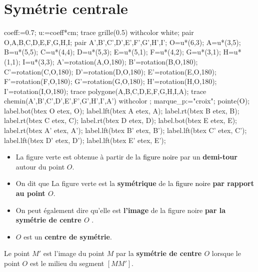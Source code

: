\section{Symétrie centrale}
\begin{minipage}{0.5\linewidth}
\begin{center}

    \begin{Geometrie}[CoinHD={(8.4u,4.2u)}]
        coeff:=0.7;
        u:=coeff*cm;        
        trace grille(0.5) withcolor white;        
        pair O,A,B,C,D,E,F,G,H,I;
        pair A',B',C',D',E',F',G',H',I';
        O=u*(6,3);
        A=u*(3,5);
        B=u*(5,5);
        C=u*(4,4);
        D=u*(5,3);
        E=u*(5,1);
        F=u*(4,2);
        G=u*(3,1);
        H=u*(1,1);
        I=u*(3,3);        
        A'=rotation(A,O,180);
        B'=rotation(B,O,180);
        C'=rotation(C,O,180);
        D'=rotation(D,O,180);
        E'=rotation(E,O,180);
        F'=rotation(F,O,180);
        G'=rotation(G,O,180);
        H'=rotation(H,O,180);
        I'=rotation(I,O,180);
        trace polygone(A,B,C,D,E,F,G,H,I,A);
        trace chemin(A',B',C',D',E',F',G',H',I',A') withcolor \myMetapostGreen;
        marque_p:="croix";
        pointe(O);
        label.bot(btex O etex, O);
        label.lft(btex A etex, A);
        label.rt(btex B etex, B);
        label.rt(btex C etex, C);
        label.rt(btex D etex, D);
        label.bot(btex E etex, E);  
        label.rt(btex A' etex, A');
        label.lft(btex B' etex, B');
        label.lft(btex C' etex, C');
        label.lft(btex D' etex, D');
        label.lft(btex E' etex, E');
    \end{Geometrie}    
\end{center}
\end{minipage}
\begin{minipage}{0.6\linewidth}
\begin{changemargin}{0mm}{-5mm}
    \begin{vocabulaire}
        \begin{itemize}    
            \item La \textcolor{mygreen}{figure verte} est obtenue à partir de la \textcolor{black}{figure noire} par un \textbf{demi-tour} autour du point $O$.
            \item On dit que La \textcolor{mygreen}{figure verte} est la \textbf{symétrique} de la \textcolor{black}{figure noire} \textbf{par rapport au point $O$}.
            \item On peut également dire qu'elle est \textbf{l'image} de la figure noire \textbf{par la symétrie de centre $O$} .
            \item $O$ est un \textbf{centre de symétrie}.
        \end{itemize}
    \end{vocabulaire}
\end{changemargin}
\end{minipage}

\begin{definition}
    Le point $M'$ est l'image du point $M$ par la \textbf{symétrie de centre $O$} lorsque le point $O$ est le milieu du segment $[MM']$.
 \end{definition}